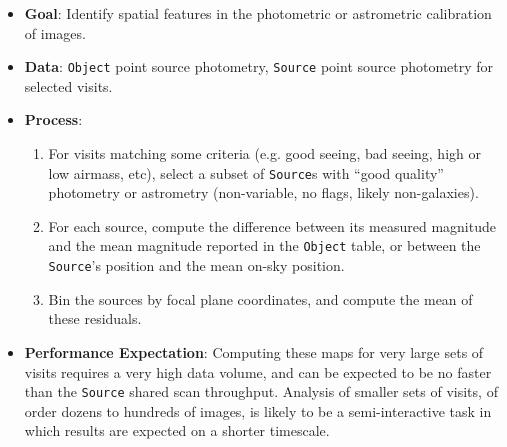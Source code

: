 \documentclass[DM,authoryear,toc]{lsstdoc}
\begin{document}
\begin{itemize}
  \item \textbf{Goal}: Identify spatial features in the photometric or
  astrometric calibration of images.
  \item \textbf{Data}: \texttt{Object} point source photometry, \texttt{Source}
  point source photometry for selected visits.
  \item \textbf{Process}:
  \begin{enumerate}
    \item For visits matching some criteria (e.g. good seeing, bad seeing, high
    or low airmass, etc), select a subset of \texttt{Source}s with ``good quality''
    photometry or astrometry (non-variable, no flags, likely non-galaxies).
    \item For each source, compute the difference between its measured magnitude
    and the mean magnitude reported in the \texttt{Object} table, or between the
    \texttt{Source}'s position and the mean on-sky position.
    \item Bin the sources by focal plane coordinates, and compute the mean of
    these residuals.
  \end{enumerate}
  \item \textbf{Performance Expectation}: Computing these maps for very large
  sets of visits requires a very high data volume, and can be expected to be no
  faster than the \texttt{Source} shared scan throughput. Analysis of smaller
  sets of visits, of order dozens to hundreds of images, is likely to be a
  semi-interactive task in which results are expected on a shorter timescale.
\end{itemize}


\end{document}
